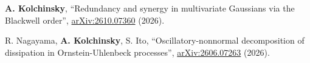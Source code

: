 \newcommand{\CA}{$^\dagger$}

\textbf{A. Kolchinsky}, ``Redundancy and synergy in multivariate Gaussians via the Blackwell order'', \href{https://arxiv.org/abs/2610.07360}{arXiv:2610.07360} (2026).

R. Nagayama, \textbf{A. Kolchinsky}, S. Ito, ``Oscillatory-nonnormal decomposition of dissipation in Ornstein-Uhlenbeck processes'', \href{https://arxiv.org/abs/2606.07263}{arXiv:2606.07263} (2026).




